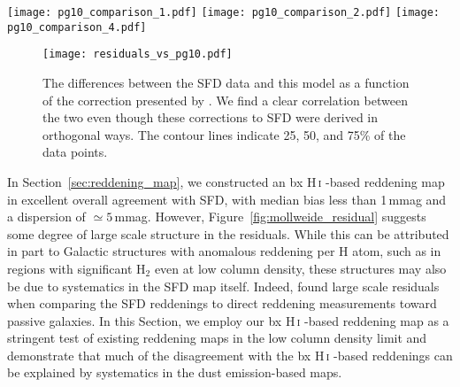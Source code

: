 \documentclass[iop,apj]{emulateapj}
\makeatletter
\def\testbx{bx}%
\DeclareRobustCommand{\ion}[2]{%
\relax\ifmmode
\ifx\testbx\f@series
{\mathbf{#1\,\mathsc{#2}}}\else
{\mathrm{#1\,\mathsc{#2}}}\fi
\else\textup{#1\,{\mdseries\textsc{#2}}}%
\fi}
\makeatother
\begin{document}
\begin{figure*}[tp]
	\texttt{[image: pg10\_comparison\_1.pdf]}
    \texttt{[image: pg10\_comparison\_2.pdf]}
    \texttt{[image: pg10\_comparison\_4.pdf]}
	\caption{Correction to the SFD map by \citet{Peek+Graves_2010} based on optical observations of passive galaxies (\textbf{left}) and the differences between the SFD map and the \ion{H}{i}-based map derived in this work (\textbf{center}). Given the completely independent methods, the agreement between the two maps is striking. The \textbf{right} image shows the SFD dust temperature, which shows little correlation with the large scale structures in the other images. For all images, we show the zenith equal area projection of the northern Galactic hemisphere. Galactic longitude $l$ increases clockwise, $l=0^{\circ}$ points down.}
	\label{fig:pg10_comparison}
\end{figure*}

\begin{figure}[tp]
	\texttt{[image: residuals\_vs\_pg10.pdf]}
	\caption{The differences between the SFD data and this model as a function of the correction presented by \citet{Peek+Graves_2010}. We find a clear correlation between the two even though these corrections to SFD were derived in orthogonal ways. The contour lines indicate 25, 50, and 75\% of the data points.}
	\label{fig:residuals_vs_pg10}
\end{figure}

In Section~\ref{sec:reddening_map}, we constructed an \ion{H}{i}-based reddening map in excellent overall agreement with SFD, with median bias less than 1\,mmag and a dispersion of $\simeq 5$\,mmag. However, Figure~\ref{fig:mollweide_residual} suggests some degree of large scale structure in the residuals. While this can be attributed in part to Galactic structures with anomalous reddening per H atom, such as in regions with significant H$_2$ even at low column density, these structures may also be due to systematics in the SFD map itself. Indeed, \citet{Peek+Graves_2010} found large scale residuals when comparing the SFD reddenings to direct reddening measurements toward passive galaxies. In this Section, we employ our \ion{H}{i}-based reddening map as a stringent test of existing reddening maps in the low column density limit and demonstrate that much of the disagreement with the \ion{H}{i}-based reddenings can be explained by systematics in the dust emission-based maps.
\end{document}
